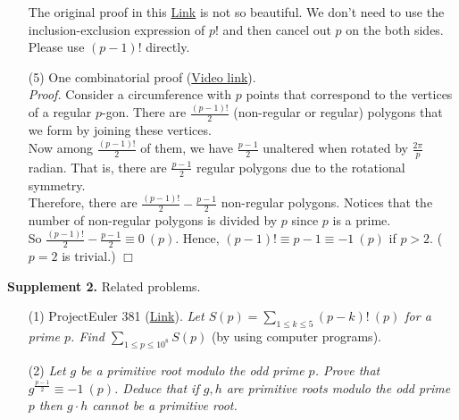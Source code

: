 \documentclass{article}
\begin{document}
\begin{enumerate}
The original proof in this \href{http://campus.lakeforest.edu/trevino/WilsonCapsule.pdf}{Link}
is not so beautiful. We don't need to use the inclusion-exclusion expression of $p!$
and then cancel out $p$ on the both sides. Please use $(p - 1)!$ directly.
\item[(5)]
One combinatorial proof
(\href{https://www.youtube.com/watch?v=4qbh7mC6YCY}{Video link}). \\
\emph{Proof.}
Consider a circumference with $p$ points that correspond to the vertices of a regular $p$-gon.
There are $\frac{(p - 1)!}{2}$ (non-regular or regular) polygons
that we form by joining these vertices. \\

Now among $\frac{(p - 1)!}{2}$ of them, we have $\frac{p - 1}{2}$ unaltered
when rotated by $\frac{2 \pi}{p}$ radian.
That is, there are $\frac{p - 1}{2}$ regular polygons due to the rotational symmetry. \\

Therefore, there are $\frac{(p - 1)!}{2} - \frac{p - 1}{2}$ non-regular polygons.
Notices that the number of non-regular polygons is divided by $p$ since $p$ is a prime. \\

So $\frac{(p - 1)!}{2} - \frac{p - 1}{2} \equiv 0 \: (p)$.
Hence, $(p - 1)! \equiv p - 1 \equiv -1 \: (p)$ if $p > 2$. ($p = 2$ is trivial.)
$\Box$ \\

\end{enumerate}

\textbf{Supplement 2.} Related problems.
\begin{enumerate}
\item[(1)] ProjectEuler 381
(\href{https://projecteuler.net/problem=381}{Link}).
\emph{Let $S(p) = \sum_{1 \leq k \leq 5}(p-k)! \: (p)$ for a prime $p$.
Find $\sum_{1 \leq p \leq {10}^8} S(p)$} (by using computer programs).
\item[(2)]
\emph{Let $g$ be a primitive root modulo the odd prime $p$.
Prove that $g^{\frac{p - 1}{2}} \equiv -1 \: (p)$.
Deduce that if $g, h$ are primitive roots modulo the odd prime $p$
then $g \cdot h$ cannot be a primitive root.}
\end{enumerate}
\end{document}
